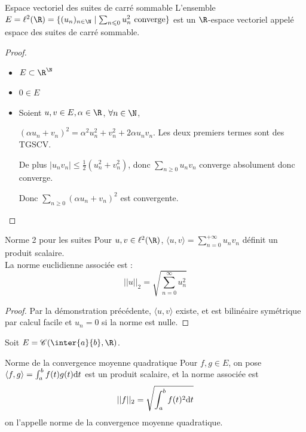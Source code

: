 \begin{theoreme}{Espace vectoriel des suites de carré sommable}{}
    L'ensemble $E = \ell^2(\R) = \{(u_n)_{n \in \N} \mid \sum_{n \leqslant 0 }u_n^2 \text{ converge}\}$
    est un $\R$-espace vectoriel appelé espace des suites de carré sommable. 
\end{theoreme}


\begin{proof}~
    \begin{itemize}
        \item $E \subset \R^{\N}$
        
        \item $0 \in E$

        \item Soient $u, v \in E, \alpha \in \R$, $\forall n \in \N$,
        
        $(\alpha u_n + v_n)^2 = \alpha^2u_n^2 + v_n^2 + 2 \alpha u_n v_n$. Les deux premiers termes sont des TGSCV.

        De plus $|u_n v_n| \leqslant \frac 1 2 (u_n^2 + v_n^2)$, donc $\sum_{n \geqslant 0} u_n v_n$ converge absolument donc converge. 

        Donc $\sum_{n \geqslant 0} (\alpha u_n + v_n)^2$ est convergente. 
    \end{itemize}
\end{proof}

\begin{theoreme}{Norme 2 pour les suites}{}
    Pour $u, v \in \ell^2(\R)$, $\displaystyle \langle u, v \rangle = \sum_{n = 0 }^{+ \infty} u_n v_n$
    définit un produit scalaire. \\

    La norme euclidienne associée est : 
    $$||u||_2 = \sqrt{\sum_{n = 0 }^{\infty}u_n^2}$$
\end{theoreme}

\begin{proof}
    Par la démonstration précédente, $\langle u, v \rangle$ existe, et est bilinéaire symétrique par calcul 
    facile et $u_n = 0$ si la norme est nulle. 
\end{proof}

Soit $E = \mathscr C(\inter{a}{b}, \R)$.

\begin{theoreme}{Norme de la convergence moyenne quadratique}{}
    Pour $f, g \in E$, on pose 
    $\langle f, g \rangle = \int_{a}^{b} f(t)g(t) \text d t$
    est un produit scalaire, et la norme associée est 
    $$||f||_2 = \sqrt{\int_{a }^{b } f(t)^2 \text d t}$$
    on l'appelle norme de la convergence moyenne quadratique. 
\end{theoreme}


